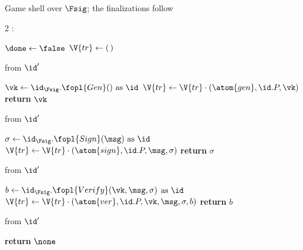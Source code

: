 \documentclass[10pt,oneside,openany]{book}
\theoremstyle{accentdef}
\theoremstyle{accentplain}
\begin{document}
\begin{interface}[nofloat]{Game shell over $\Fsig$; the finalizations follow \\
}

{\scriptsize
\setlength{\columnsep}{1.4em}
\begin{multicols}{2}
:
\begin{algorithmic}[1]
\setcounter{contline}{0}\algcont
\State $\done \gets \false$
\State $\V{tr} \gets (\,)$
\algsave
\end{algorithmic}
\vspace{1.4ex}

 \quad from $\id'$
\begin{algorithmic}[1]
\algcont
\Req{$\neg\done$}
\State $\vk \gets \id_{\Fsig}.\fopl{Gen}() \text{ as } \id$
\State $\V{tr} \gets \V{tr} \cdot (\atom{gen},\id.P,\vk)$
\State \textbf{return} $\vk$
\algsave
\end{algorithmic}
\vspace{1.4ex}

 \quad from $\id'$
\begin{algorithmic}[1]
\algcont
\Req{$\neg\done$}
\State $\sigma \gets \id_{\Fsig}.\fopl{Sign}(\msg) \text{ as } \id$ \label{ln:gsign}
\State $\V{tr} \gets \V{tr} \cdot (\atom{sign},\id.P,\msg,\sigma)$
\State \textbf{return} $\sigma$
\algsave
\end{algorithmic}
\vspace{1.4ex}

\columnbreak

 \quad from $\id'$
\begin{algorithmic}[1]
\algcont
\Req{$\neg\done$}
\State $b \gets \id_{\Fsig}.\fopl{Verify}(\vk,\msg,\sigma)$
\Statex \quad $\text{as } \id$
\State $\V{tr} \gets \V{tr} \cdot (\atom{ver},\id.P,\vk,\msg,\sigma,b)$
\State \textbf{return} $b$
\algsave
\end{algorithmic}
\vspace{1.4ex}

 \quad from $\id'$
\begin{algorithmic}[1]
\algcont
\State \textbf{return} $\none$
\algsave
\end{algorithmic}
\vspace{1.4ex}

\end{multicols}}
\end{interface}
\end{document}
